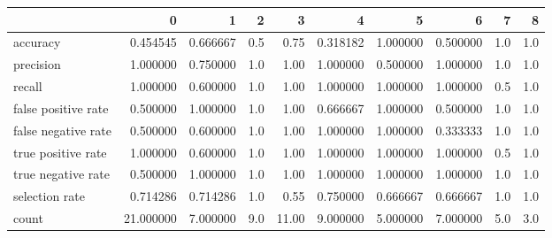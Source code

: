 \begin{tabular}{lrrrrrrrrr}
\toprule
{} &          0 &         1 &    2 &      3 &         4 &         5 &         6 &    7 &    8 \\
\midrule
accuracy            &   0.454545 &  0.666667 &  0.5 &   0.75 &  0.318182 &  1.000000 &  0.500000 &  1.0 &  1.0 \\
precision           &   1.000000 &  0.750000 &  1.0 &   1.00 &  1.000000 &  0.500000 &  1.000000 &  1.0 &  1.0 \\
recall              &   1.000000 &  0.600000 &  1.0 &   1.00 &  1.000000 &  1.000000 &  1.000000 &  0.5 &  1.0 \\
false positive rate &   0.500000 &  1.000000 &  1.0 &   1.00 &  0.666667 &  1.000000 &  0.500000 &  1.0 &  1.0 \\
false negative rate &   0.500000 &  0.600000 &  1.0 &   1.00 &  1.000000 &  1.000000 &  0.333333 &  1.0 &  1.0 \\
true positive rate  &   1.000000 &  0.600000 &  1.0 &   1.00 &  1.000000 &  1.000000 &  1.000000 &  0.5 &  1.0 \\
true negative rate  &   0.500000 &  1.000000 &  1.0 &   1.00 &  1.000000 &  1.000000 &  1.000000 &  1.0 &  1.0 \\
selection rate      &   0.714286 &  0.714286 &  1.0 &   0.55 &  0.750000 &  0.666667 &  0.666667 &  1.0 &  1.0 \\
count               &  21.000000 &  7.000000 &  9.0 &  11.00 &  9.000000 &  5.000000 &  7.000000 &  5.0 &  3.0 \\
\bottomrule
\end{tabular}
